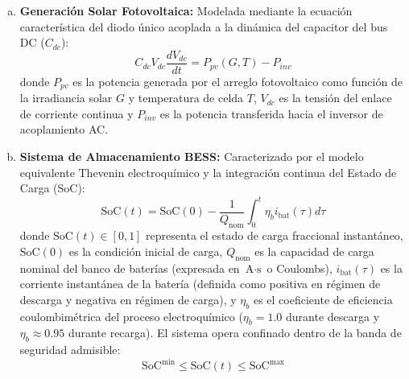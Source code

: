 \begin{enumerate}[a)]
    \item \textbf{Generación Solar Fotovoltaica:} Modelada mediante la ecuación característica del diodo único acoplada a la dinámica del capacitor del bus DC ($C_{dc}$):
    \begin{equation}
    C_{dc} V_{dc} \frac{dV_{dc}}{dt} = P_{pv}(G, T) - P_{inv}
    \end{equation}
    donde $P_{pv}$ es la potencia generada por el arreglo fotovoltaico como función de la irradiancia solar $G$ y temperatura de celda $T$, $V_{dc}$ es la tensión del enlace de corriente continua y $P_{inv}$ es la potencia transferida hacia el inversor de acoplamiento AC.
    
    \item \textbf{Sistema de Almacenamiento BESS:} Caracterizado por el modelo equivalente Thevenin electroquímico y la integración continua del Estado de Carga (SoC):
    \begin{equation}
    \text{SoC}(t) = \text{SoC}(0) - \frac{1}{Q_{\text{nom}}} \int_0^t \eta_b i_{\text{bat}}(\tau) d\tau
    \end{equation}
    donde $\text{SoC}(t) \in [0, 1]$ representa el estado de carga fraccional instantáneo, $\text{SoC}(0)$ es la condición inicial de carga, $Q_{\text{nom}}$ es la capacidad de carga nominal del banco de baterías (expresada en $\text{A}\cdot\text{s}$ o Coulombs), $i_{\text{bat}}(\tau)$ es la corriente instantánea de la batería (definida como positiva en régimen de descarga y negativa en régimen de carga), y $\eta_b$ es el coeficiente de eficiencia coulombimétrica del proceso electroquímico ($\eta_b = 1.0$ durante descarga y $\eta_b \approx 0.95$ durante recarga). El sistema opera confinado dentro de la banda de seguridad admisible:
    \[
    \text{SoC}^{\min} \le \text{SoC}(t) \le \text{SoC}^{\max}
    \]
    

\end{enumerate}
